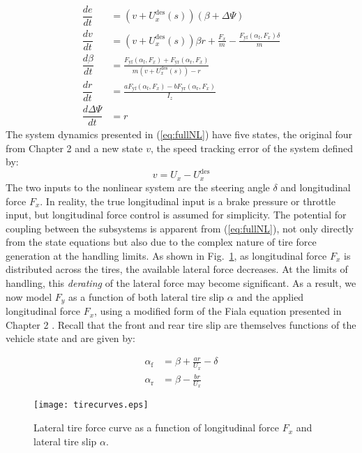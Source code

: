 \begin{align}
\label{eq:fullNL}
	\dfrac{de}{dt} &= \left(v+U^\mathrm{des}_x(s)\right)(\beta + \Delta\Psi) \\
	\dfrac{dv}{dt} &= \left(v+U^\mathrm{des}_x(s)\right)\beta r + \frac{F_x}{m} - \frac{F_\mathrm{yf}(\alpha_\mathrm{f},F_x)\delta}{m}\\
	\dfrac{d\beta}{dt} &= \frac{F_\mathrm{yf}(\alpha_\mathrm{f}, F_x) + F_\mathrm{yr}(\alpha_\mathrm{r},F_x)}{m\left(v + U^\mathrm{des}_x(s)\right) - r} \\
	\dfrac{dr}{dt}     &= \frac{aF_\mathrm{yf}(\alpha_\mathrm{f}, F_x) - bF_\mathrm{yr}(\alpha_\mathrm{r}, F_x)}{I_z} \\
	\dfrac{d\Delta\Psi}{dt} &= r \label{eq:fullNL2}
\end{align}
The system dynamics presented in (\ref{eq:fullNL}) have five states, the original four from Chapter 2 and a new state $v$, the
 speed tracking error of the system defined by:
\begin{equation}
v = U_x - U^\mathrm{des}_x
\end{equation}
The two inputs to the nonlinear system are the steering angle $\delta$ and longitudinal force $F_x$. In reality,
the true longitudinal input is a brake pressure or throttle input, but longitudinal force control is assumed for simplicity.
The potential for coupling between the subsystems is apparent from (\ref{eq:fullNL}), not only directly from the state
equations but also due to the complex nature of tire force generation at the handling limits. As shown in Fig.~\ref{fig:coupledTires}, as longitudinal
force $F_x$ is distributed across the tires, the available lateral force decreases. At the limits of handling, this
\textit{derating} of the lateral force may become significant. As a result, we now model $F_y$ as a function
of both lateral tire slip $\alpha$ and the applied longitudinal force $F_x$, using a modified form of the Fiala equation
presented in Chapter 2 \cite{rami}. Recall that the front and rear tire slip are themselves functions of the vehicle state and are
given by: 

\begin{subequations}
\begin{align}
	\alpha_\mathrm{f} &= \beta + \frac{ar}{U_x} - \delta\\
	\alpha_\mathrm{r} &= \beta - \frac{br}{U_x}
\end{align}
\end{subequations}

\begin{figure}[tb]
\centering
\texttt{[image: tirecurves.eps]}
\caption{Lateral tire force curve as a function of longitudinal force $F_x$ and lateral tire slip $\alpha$.}
\label{fig:coupledTires}
\end{figure} 

